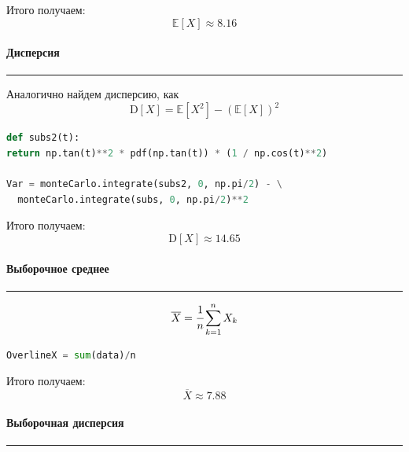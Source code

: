 \documentclass[a4paper, 14pt]{extarticle}
\begin{document}
Итого получаем:
\begin{equation*}
  \mathbb{E}[X] \approx 8.16
\end{equation*}

\paragraph{Дисперсия}\vspace{-20pt}\rule{\linewidth}{0.1mm}

Аналогично найдем дисперсию, как 
\begin{equation*}
  \text{D}[X] = \mathbb{E}[X^2] - (\mathbb{E}[X])^2
\end{equation*}

\begin{center}
  \begin{lstlisting}[language=Python]
def subs2(t):
return np.tan(t)**2 * pdf(np.tan(t)) * (1 / np.cos(t)**2) 

Var = monteCarlo.integrate(subs2, 0, np.pi/2) - \
  monteCarlo.integrate(subs, 0, np.pi/2)**2
  \end{lstlisting}
\end{center}
\vspace{10pt}
Итого получаем:
\begin{equation*}
  \text{D}[X] \approx 14.65
\end{equation*}

\paragraph{Выборочное среднее}\vspace{-20pt}\rule{\linewidth}{0.1mm}

\begin{equation*}
  \overline{X} = \cfrac{1}{n} \sum_{k=1}^{n} X_k 
\end{equation*}

\begin{center}
  \begin{lstlisting}[language=Python]
OverlineX = sum(data)/n
  \end{lstlisting}
\end{center}
\vspace{10pt}
Итого получаем:
\begin{equation*}
  \overline{X} \approx 7.88
\end{equation*}

\paragraph{Выборочная дисперсия}\vspace{-20pt}\rule{\linewidth}{0.1mm}
\end{document}
